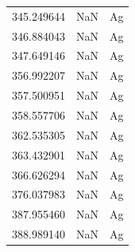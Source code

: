 \begin{longtable}{rrl}
345.249644 & NaN & Ag \\
346.884043 & NaN & Ag \\
347.649146 & NaN & Ag \\
356.992207 & NaN & Ag \\
357.500951 & NaN & Ag \\
358.557706 & NaN & Ag \\
362.535305 & NaN & Ag \\
363.432901 & NaN & Ag \\
366.626294 & NaN & Ag \\
376.037983 & NaN & Ag \\
387.955460 & NaN & Ag \\
388.989140 & NaN & Ag \\
\end{longtable}
